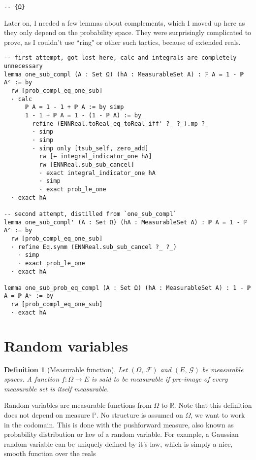 \documentclass[a4paper, 12pt]{article}
\newtheorem{definition}{Definition}
\newcommand{\R}{\mathbb{R}}
\newcommand{\F}{\mathcal{F}}
\renewcommand{\P}{\mathbb{P}}
\begin{document}
\begin{lstlisting}
-- {Ω}
\end{lstlisting}

Later on, I needed a few lemmas about complements,
which I moved up here as they only depend on the probability space.
They were surprisingly complicated to prove, as I couldn't use ``ring"
or other such tactics, because of extended reals.

\begin{lstlisting}
-- first attempt, got lost here, calc and integrals are completely unnecessary
lemma one_sub_compl (A : Set Ω) (hA : MeasurableSet A) : ℙ A = 1 - ℙ Aᶜ := by
  rw [prob_compl_eq_one_sub]
  · calc
      ℙ A = 1 - 1 + ℙ A := by simp
      1 - 1 + ℙ A = 1 - (1 - ℙ A) := by
        refine (ENNReal.toReal_eq_toReal_iff' ?_ ?_).mp ?_
        · simp
        · simp
        · simp only [tsub_self, zero_add]
          rw [← integral_indicator_one hA]
          rw [ENNReal.sub_sub_cancel]
          · exact integral_indicator_one hA
          · simp
          · exact prob_le_one
  · exact hA

-- second attempt, distilled from `one_sub_compl`
lemma one_sub_compl' (A : Set Ω) (hA : MeasurableSet A) : ℙ A = 1 - ℙ Aᶜ := by
  rw [prob_compl_eq_one_sub]
  · refine Eq.symm (ENNReal.sub_sub_cancel ?_ ?_)
    · simp
    · exact prob_le_one
  · exact hA

lemma one_sub_prob_eq_compl (A : Set Ω) (hA : MeasurableSet A) : 1 - ℙ A = ℙ Aᶜ := by
  rw [prob_compl_eq_one_sub]
  · exact hA
\end{lstlisting}







\section*{Random variables}

\begin{definition}[Measurable function]
Let $(\Omega,\,\F)$ and $(E,\,\mathcal{G})$ be measurable spaces.
A function $f \colon \Omega \rightarrow E$ is said to be measurable
if pre-image of every measurable set is itself measurable.
\end{definition}

Random variables are measurable functions from $\Omega$ to $\R$.
Note that this definition does not depend on measure $\P$.
No structure is assumed on $\Omega$, we want to work in the codomain.
This is done with the pushforward measure,
also known as probability distribution or law of a random variable.
For example, a Gaussian random variable can be uniquely defined by it's law,
which is simply a nice, smooth function over the reals
\end{document}
